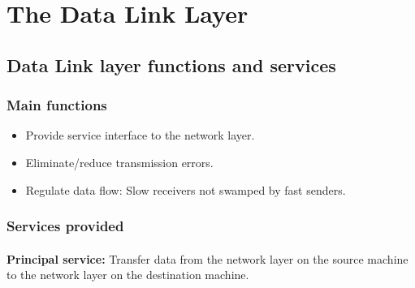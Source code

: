 \documentclass[../resumosRCOM.tex]{subfiles}
\begin{document}
 
\section{The Data Link Layer}
\subsection{Data Link layer functions and services}
\subsubsection{Main functions}
\begin{itemize}
    \item Provide service interface to the network layer.
    \item Eliminate/reduce transmission errors.
    \item Regulate data flow: Slow receivers not swamped by fast senders.
\end{itemize}

\subsubsection{Services provided}
\paragraph{}
\textbf{Principal service: }Transfer data from the network layer on the 
source machine to the network layer on the destination machine.
\end{document}
